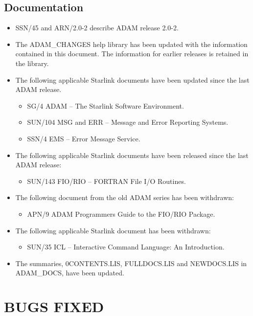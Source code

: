 \subsection{Documentation}
\label{docs}
\begin{itemize}
\item SSN/45 and ARN/2.0-2 describe ADAM release 2.0-2.
\item The ADAM\_CHANGES help library has been updated
with the information contained in this document. The information for earlier
releases is
retained in the library.
\item The following applicable Starlink documents have been updated since the
last ADAM release.
\begin{itemize}
\item SG/4 ADAM -- The Starlink Software Environment.
\item SUN/104 MSG and ERR -- Message and Error Reporting Systems.
\item SSN/4 EMS -- Error Message Service.
\end{itemize}
\item The following applicable Starlink documents have been released since the
last ADAM release:
\begin{itemize}
\item SUN/143 FIO/RIO -- FORTRAN File I/O Routines.
\end{itemize}
\item The following document from the old ADAM series has been withdrawn:
\begin{itemize}
\item APN/9 ADAM Programmers Guide to the FIO/RIO Package.
\end{itemize}
\item The following applicable Starlink document has been withdrawn:
\begin{itemize}
\item SUN/35 ICL -- Interactive Command Language: An Introduction.
\end{itemize}
\item The summaries, 0CONTENTS.LIS, FULLDOCS.LIS and NEWDOCS.LIS in
ADAM\-\_DOCS, have been updated.
\end{itemize}

\section{BUGS FIXED}

